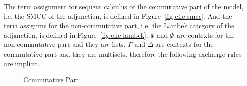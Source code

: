 The term assignment for sequent calculus of the commutative part of the model, i.e. the SMCC of
the adjunction, is defined in Figure~\ref{fig:elle-smcc}. And the term assignme for the
non-commutative part, i.e. the Lambek category of the adjunction, is defined in
Figure~\ref{fig:elle-lambek}. $\Psi$ and $\Phi$ are contexts for the non-commutative part
and they are lists. $\Gamma$ and $\Delta$ are contexts for the commutative part and they are
multisets, therefore the following exchange rules are implicit.

\begin{mathpar}
\scriptsize
\end{mathpar}

\begin{figure}[!h]
 \scriptsize
  \begin{mdframed}
    \begin{mathpar}
    \end{mathpar}
  \end{mdframed}
\caption{Commutative Part}
\label{fig:elle-nd-smcc}
\end{figure}

